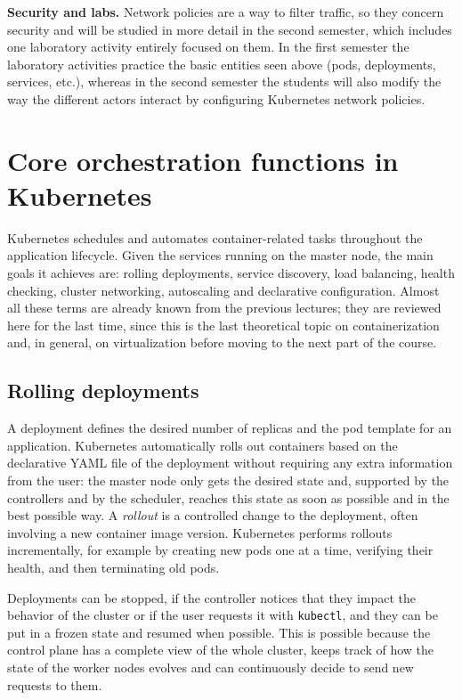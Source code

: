 \begin{notebox}
	\textbf{Security and labs.} Network policies are a way to filter traffic, so they concern security and will be studied in more detail in the second semester, which includes one laboratory activity entirely focused on them. In the first semester the laboratory activities practice the basic entities seen above (pods, deployments, services, etc.), whereas in the second semester the students will also modify the way the different actors interact by configuring Kubernetes network policies.
\end{notebox}

\section{Core orchestration functions in Kubernetes}

Kubernetes schedules and automates container-related tasks throughout the application lifecycle. Given the services running on the master node, the main goals it achieves are: rolling deployments, service discovery, load balancing, health checking, cluster networking, autoscaling and declarative configuration. Almost all these terms are already known from the previous lectures; they are reviewed here for the last time, since this is the last theoretical topic on containerization and, in general, on virtualization before moving to the next part of the course.

\subsection{Rolling deployments}

A deployment defines the desired number of replicas and the pod template for an application. Kubernetes automatically rolls out containers based on the declarative YAML file of the deployment without requiring any extra information from the user: the master node only gets the desired state and, supported by the controllers and by the scheduler, reaches this state as soon as possible and in the best possible way. A \emph{rollout} is a controlled change to the deployment, often involving a new container image version. Kubernetes performs rollouts incrementally, for example by creating new pods one at a time, verifying their health, and then terminating old pods.

Deployments can be stopped, if the controller notices that they impact the behavior of the cluster or if the user requests it with \texttt{kubectl}, and they can be put in a frozen state and resumed when possible. This is possible because the control plane has a complete view of the whole cluster, keeps track of how the state of the worker nodes evolves and can continuously decide to send new requests to them.

